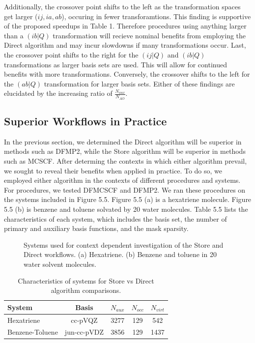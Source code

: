Additionally, the crossover point shifts to the left as the transformation spaces get larger ($ij, ia, ab$), occuring in fewer transforamtions.
This finding is supportive of the proposed speedups in Table 1.
Therefore procedures using anything larger than a $(ib|Q)$ transformation will recieve nominal benefits from employing the 
Direct algorithm and may incur slowdowns if many transformations occur.
Last, the crossover point shifts to the right for the $(ij|Q)$ and $(ib|Q)$ transformations as larger basis sets are used. 
This will allow for 
continued benefits with more transformations. Conversely, the crossover shifts to the left for the $(ab|Q)$ transformation
for larger basis sets. Either of these findings are elucidated
by the increasing ratio of $\frac{N_{aux}}{N_{AO}}$. 
 
\subsection{Superior Workflows in Practice}

In the previous section, we determined the Direct algorithm will be superior in methods such as DFMP2, while the Store 
algorithm will be superior in methods such as MCSCF.
After determing the contexts in which either algorithm prevail, we sought to reveal their benefits when applied in practice. 
To do so, we employed either algorithm
in the contexts of different procedures and systems.  For procedures, we tested DFMCSCF and DFMP2.  We ran these 
procedures on the systems included in Figure 5.5.
Figure 5.5 (a) is a hexatriene molecule.  Figure 5.5 (b) is benzene and toluene solvated by 20 water molecules.
Table 5.5 lists the characteristics of each system,
which includes the basis set, the number of primary and auxiliary basis functions, and the mask sparsity. 


\begin{figure}[H]
  \captionsetup[subfigure]{}
  \centering
  \hfill
  \caption{Systems used for context dependent investigation of the Store and Direct workflows. (a) Hexatriene. (b) Benzene and toluene 
in 20 water solvent molecules. }
\end{figure}

\begingroup
\begin{table}[H]
\centering
\renewcommand{\baselinestretch}{1}
\caption{Characteristics of systems for Store vs Direct algorithm comparisons.}
\begin{tabular}{l cccc}
\multicolumn{1}{l}{\textbf{System}} &
\multicolumn{1}{c}{\textbf{Basis}} &
\multicolumn{1}{c}{\textbf{$N_{aux}$}} &
\multicolumn{1}{c}{\textbf{$N_{occ}$}} &
\multicolumn{1}{c}{\textbf{$N_{virt}$}} \\
\hline
Hexatriene        & cc-pVQZ     & 3277      & 129       & 542        \\ 
Benzene-Toluene   & jun-cc-pVDZ & 3856      & 129       & 1437       \\ 
\end{tabular}
\end{table}
\endgroup

